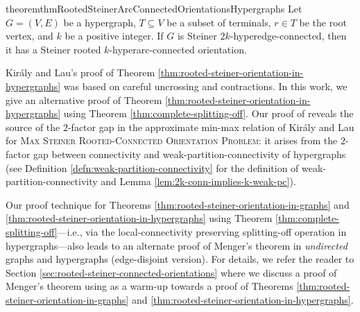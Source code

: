 \begin{restatable}{theorem}{thmRootedSteinerArcConnectedOrientationsHypergraphs}\label{thm:rooted-steiner-orientation-in-hypergraphs}
Let $G=(V, E)$ be a hypergraph, $T\subseteq V$ be a subset of terminals, $r\in T$ be the root vertex, and $k$ be a positive integer. If $G$ is Steiner $2k$-hyperedge-connected, then it has a Steiner rooted $k$-hyperarc-connected orientation. 
\end{restatable}
Kir\'{a}ly and Lau's proof of Theorem \ref{thm:rooted-steiner-orientation-in-hypergraphs} was based on careful uncrossing and contractions. In this work, we give an alternative proof of Theorem \ref{thm:rooted-steiner-orientation-in-hypergraphs} using Theorem \ref{thm:complete-splitting-off}. 
Our proof of  reveals the source of the $2$-factor gap in the approximate min-max relation of Kir\'{a}ly and Lau for \textsc{Max Steiner Rooted-Connected Orientation Problem}: it arises from the $2$-factor gap between connectivity and weak-partition-connectivity of hypergraphs (see Definition \ref{defn:weak-partition-connectivity} for the definition of weak-partition-connectivity and Lemma \ref{lem:2k-conn-implies-k-weak-pc}). 

\begin{remark}
Our proof technique for Theorems \ref{thm:rooted-steiner-orientation-in-graphs} and \ref{thm:rooted-steiner-orientation-in-hypergraphs} using Theorem \ref{thm:complete-splitting-off}---i.e., via the local-connectivity preserving splitting-off operation in hypergraphs---also leads to an alternate proof of Menger's theorem in \emph{undirected} graphs and hypergraphs (edge-disjoint version). For details, we refer the reader to Section \ref{sec:rooted-steiner-connected-orientations} where we discuss a proof of Menger's theorem using  as a warm-up towards a proof of Theorems \ref{thm:rooted-steiner-orientation-in-graphs} and \ref{thm:rooted-steiner-orientation-in-hypergraphs}. 
\end{remark}

